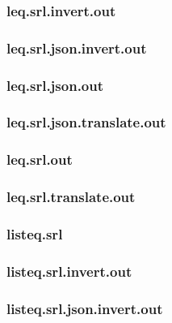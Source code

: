 \subsubsection{leq.srl.invert.out}
\label{app:leq_srl.invert.out}

\subsubsection{leq.srl.json.invert.out}
\label{app:leq_srl.json.invert.out}

\subsubsection{leq.srl.json.out}
\label{app:leq_srl.json.out}

\subsubsection{leq.srl.json.translate.out}
\label{app:leq_srl.json.translate.out}

\subsubsection{leq.srl.out}
\label{app:leq_srl.out}

\subsubsection{leq.srl.translate.out}
\label{app:leq_srl.translate.out}

\subsubsection{listeq.srl}
\label{app:listeq_srl}

\subsubsection{listeq.srl.invert.out}
\label{app:listeq_srl.invert.out}

\subsubsection{listeq.srl.json.invert.out}
\label{app:listeq_srl.json.invert.out}

